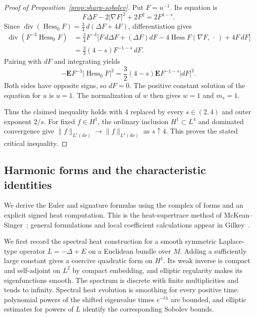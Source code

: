 \begin{proof}[Proof of Proposition~\ref{prop:sharp-sobolev}]
Put $F=u^{-1}$. Its equation is
\[
 F\Delta F-2|\nabla F|^2+2F^2=2F^{4-s}.
\]
Since
$\operatorname{div}(\operatorname{Hess}_0F)
 =\frac34\,d(\Delta F+4F)$, differentiation gives
\[
 \begin{aligned}
 \operatorname{div}(F^{-3}\operatorname{Hess}_0F)
 &=\frac34F^{-4}
 \bigl[F\,d\Delta F+(\Delta F)dF
       -4\operatorname{Hess}F(\nabla F,\,\cdot\,)+4F\,dF\bigr]\\
 &=\frac32(4-s)F^{-1-s}\,dF .
 \end{aligned}
\]
Pairing with $dF$ and integrating yields
\[
 -\mathbf E F^{-3}|\operatorname{Hess}_0F|^2
 =\frac32(4-s)\mathbf E F^{-1-s}|dF|^2.
\]
Both sides have opposite signs, so $dF=0$. The positive constant
solution of the equation for $u$ is $u=1$. The normalization of
$w$ then gives $w=1$ and $m_s=1$.

Thus the claimed inequality holds with $4$ replaced by every
$s\in(2,4)$ and outer exponent $2/s$. For fixed $f\in H^1$,
the ordinary inclusion $H^1\subset L^4$ and dominated convergence
give $\|f\|_{L^s(d\nu)}\to\|f\|_{L^4(d\nu)}$ as $s\uparrow4$.
This proves the stated critical inequality.
\end{proof}

\subsection{Harmonic forms and the characteristic identities}
\label{app:characteristic-identities}

We derive the Euler and signature formulas using the complex of forms and
an explicit signed heat computation. This is the heat-supertrace method
of McKean--Singer~\cite{McKeanSinger1967}; general formulations and local
coefficient calculations appear in Gilkey~\cite[Theorems~1.7.6 and
4.8.16]{Gilkey1984}.

We first record the spectral heat construction for a smooth symmetric
Laplace-type operator $L=-\Delta+E$ on a Euclidean bundle over $M$. Adding a sufficiently
large constant gives a coercive quadratic form on $H^1$.
Its weak inverse is compact and self-adjoint on $L^2$ by
compact embedding, and elliptic regularity makes its
eigenfunctions smooth. The spectrum is discrete with finite
multiplicities and tends to infinity. Spectral heat evolution
is smoothing for every positive time: polynomial powers of
the shifted eigenvalue times $e^{-t\lambda}$ are bounded,
and elliptic estimates for powers of $L$ identify the
corresponding Sobolev bounds.

